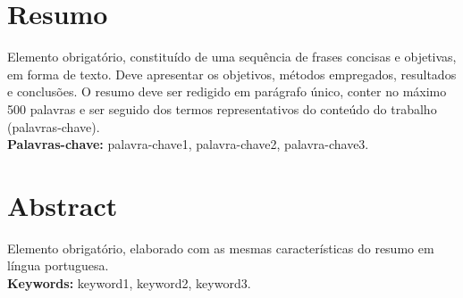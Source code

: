 \documentclass[12pt,twoside,a4paper]{book}
\begin{document}




\chapter*{Resumo}

Elemento obrigatório, constituído de uma sequência de frases concisas e
objetivas, em forma de texto.  Deve apresentar os objetivos, métodos empregados,
resultados e conclusões.  O resumo deve ser redigido em parágrafo único, conter
no máximo 500 palavras e ser seguido dos termos representativos do conteúdo do
trabalho (palavras-chave).
\\

\noindent \textbf{Palavras-chave:} palavra-chave1, palavra-chave2, palavra-chave3.

\chapter*{Abstract}

Elemento obrigatório, elaborado com as mesmas características do resumo em
língua portuguesa.
\\

\noindent \textbf{Keywords:} keyword1, keyword2, keyword3.


\tableofcontents    %
\end{document}

